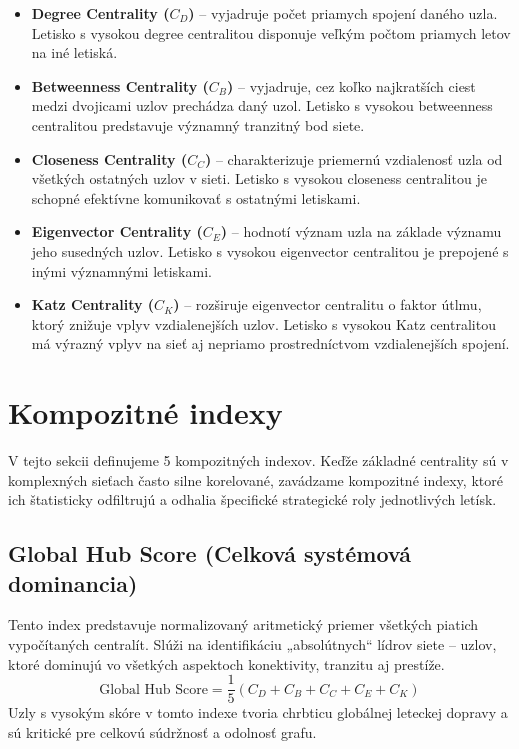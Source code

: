 \begin{itemize}

    \item \textbf{Degree Centrality ($C_D$)} -- vyjadruje počet priamych spojení daného uzla. 
    Letisko s vysokou degree centralitou disponuje veľkým počtom priamych letov na iné letiská.
    
    \item \textbf{Betweenness Centrality ($C_B$)} -- vyjadruje, cez koľko najkratších ciest medzi dvojicami uzlov prechádza daný uzol. 
    Letisko s vysokou betweenness centralitou predstavuje významný tranzitný bod siete.
    
    \item \textbf{Closeness Centrality ($C_C$)} -- charakterizuje priemernú vzdialenosť uzla od všetkých ostatných uzlov v sieti. 
    Letisko s vysokou closeness centralitou je schopné efektívne komunikovať s ostatnými letiskami.
    
    \item \textbf{Eigenvector Centrality ($C_E$)} -- hodnotí význam uzla na základe významu jeho susedných uzlov. 
    Letisko s vysokou eigenvector centralitou je prepojené s inými významnými letiskami.
    
    \item \textbf{Katz Centrality ($C_K$)} -- rozširuje eigenvector centralitu o faktor útlmu, ktorý znižuje vplyv vzdialenejších uzlov. 
    Letisko s vysokou Katz centralitou má výrazný vplyv na sieť aj nepriamo prostredníctvom vzdialenejších spojení.

\end{itemize}

\section{Kompozitné indexy}
\label{sec:indexy}

V tejto sekcii definujeme 5 kompozitných indexov. Keďže základné centrality sú v komplexných 
sieťach často silne korelované, zavádzame kompozitné indexy, ktoré ich štatisticky odfiltrujú a odhalia špecifické strategické roly 
jednotlivých letísk.

\subsection{Global Hub Score (Celková systémová dominancia)}
Tento index predstavuje normalizovaný aritmetický priemer všetkých piatich vypočítaných centralít. Slúži na identifikáciu „absolútnych“ lídrov 
siete – uzlov, ktoré dominujú vo všetkých aspektoch konektivity, tranzitu aj prestíže.
\[
\text{Global Hub Score} = \frac{1}{5} (C_D + C_B + C_C + C_E + C_K)
\]
Uzly s vysokým skóre v tomto indexe tvoria chrbticu globálnej leteckej dopravy a sú kritické pre celkovú súdržnosť a odolnosť grafu.

